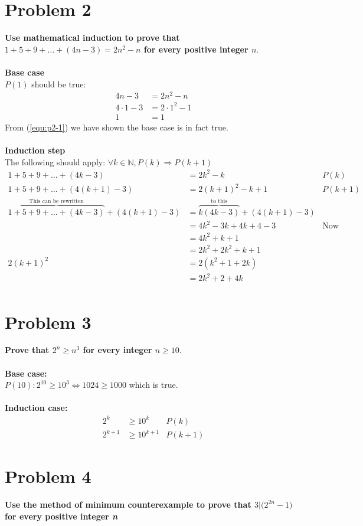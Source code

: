 \documentclass[english,11pt,a4paper]{article}
\begin{document}
\section*{Problem 2}
\textbf{Use mathematical induction to prove that $1+5+9+\ldots+(4n-3)=2n^2-n$ for every positive integer $n$}.
\\
\\
\textbf{Base case} 
\\
$P(1)$ should be true:
\begin{align}
4n-3 &= 2n^2-n \\
4\cdot 1-3 &= 2\cdot 1^2-1 \\
1 &= 1 \label{equ:p2-1}
\end{align}
From (\ref{equ:p2-1}) we have shown the base case is in fact true.
\\
\\
\textbf{Induction step}
\\
The following should apply: $\forall k \in \mathbb{N}, P(k) \Rightarrow P(k+1)$
\begin{align}
1+5+9+\ldots+(4k-3) &= 2k^2-k & P(k)\\
1+5+9+\ldots+(4(k+1)-3) &= 2(k+1)^2-k+1 & P(k+1)\\
\overbrace{1+5+9+\ldots+(4k-3)}^{\text{This can be rewritten}}+(4(k+1)-3) &= \overbrace{k(4k-3)}^\text{to this}+(4(k+1)-3)\\
	&= 4k^2-3k+4k+4-3 & \text{Now what?} \\
	&= 4k^2+k+1 \label{equ:p2-2}\\
	&= 2k^2+2k^2+k+1\\
 2(k+1)^2 &= 2(k^2+1+2k)\\
	&= 2k^2+2+4k\\
\end{align}



\section*{Problem 3}
\textbf{Prove that $2^n \geq n^3$ for every integer $n \geq 10$}.
\\
\\
\textbf{Base case:}
\\
$P(10): 2^{10}\geq 10^3 \Leftrightarrow 1024 \geq 1000$ which is true.
\\
\\
\textbf{Induction case:}
\\
\begin{align}
2^k &\geq 10^k & P(k)\\
2^{k+1} &\geq 10^{k+1} & P(k+1)
\end{align}





\section*{Problem 4}
\textbf{Use the method of minimum counterexample to prove that $3|\bigg(2^{2n}-1\bigg)$ for every positive integer \textit{n}}
\end{document}
